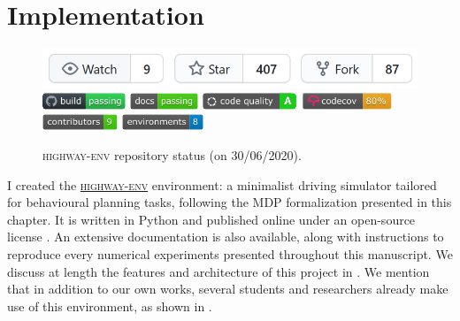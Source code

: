 \section{Implementation}

\begin{figure}[ht]
	\centering
	\includegraphics[width=0.6\linewidth]{img/he-git}\\
	\includegraphics[height=0.5cm]{img/he-buil.pdf}
	\includegraphics[height=0.5cm]{img/he-docs.pdf}
	\includegraphics[height=0.5cm]{img/he-qual.pdf}
	\includegraphics[height=0.5cm]{img/he-cov.pdf}
	\includegraphics[height=0.5cm]{img/he-contr.pdf}
	\includegraphics[height=0.5cm]{img/he-envs.pdf}
	\caption{\textsc{highway-env} repository status (on 30/06/2020).}
	\label{fig:highway-env-status}
\end{figure}

I created the \href{https://github.com/eleurent/highway-env}{\textsc{highway-env}} environment: a minimalist driving simulator tailored for behavioural planning tasks, following the \gls{MDP} formalization presented in this chapter. It is written in Python and published online under an open-source license \citep{highway-env}. An extensive documentation is also available, along with instructions to reproduce every numerical experiments presented throughout this manuscript. We discuss at length the features and architecture of this project in . We mention that in addition to our own works, several students and researchers already make use of this environment, as shown in .

